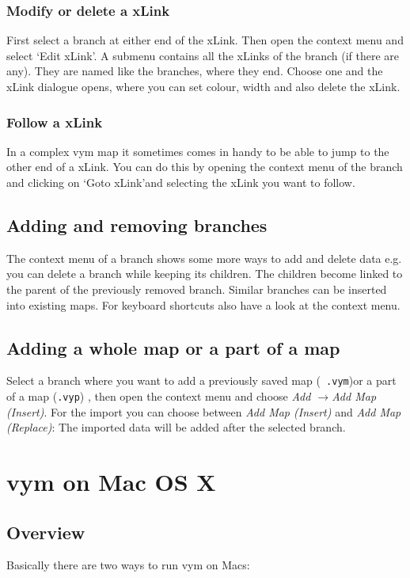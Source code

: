 \documentclass[12pt,a4paper]{article}
\newcommand{\vym}{{\sc vym }}
\newcommand{\ra}{$\longrightarrow$}
\begin{document}
\subsubsection*{Modify or delete a xLink}
First select a branch at either end of the xLink. Then open the context
menu and select \lq Edit xLink\rq. A submenu contains all the xLinks of
the branch (if there are any). They are named like the branches, where
they end. Choose one and the xLink dialogue opens, where you can set
colour, width and also delete the xLink.

\subsubsection*{Follow a xLink}
In a complex \vym map it sometimes comes in handy to be able to jump to the other end
of a xLink. You can do this by opening the context menu of the branch
and clicking on \lq Goto xLink\rq and selecting the xLink you want to
follow.



\subsection{Adding and removing branches}
The context menu of a branch shows some more ways to add and delete data
e.g. you can delete a branch while keeping its children. The children become
linked to the parent of the previously removed branch.
Similar branches can be inserted into existing maps. For keyboard
shortcuts also have a look at the context menu.

\subsection{Adding a whole map or a part of a map}
Select a branch where you want to add a previously saved map ({\tt
.vym})or a part of a map ({\tt .vyp}) , then open the context menu and
choose {\em Add \ra Add Map (Insert)}. For the import you can choose
between {\em Add Map (Insert)} and {\em Add Map (Replace)}: The imported
data will be added after the selected branch.


\section{\vym on Mac OS X}
\subsection{Overview}
Basically there are two ways to run \vym on Macs:
\end{document}
